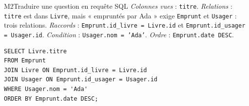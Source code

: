 \begin{fichemethode}{M2}{Traduire une question en requête SQL}
\emph{Colonnes vues} : \texttt{titre}. \emph{Relations} : \texttt{titre} est dans
\texttt{Livre}, mais « empruntés par Ada » exige \texttt{Emprunt} et \texttt{Usager} : trois
relations. \emph{Raccords} : \texttt{Emprunt.id\_livre = Livre.id} et
\texttt{Emprunt.id\_usager = Usager.id}. \emph{Condition} : \texttt{Usager.nom = 'Ada'}.
\emph{Ordre} : \texttt{Emprunt.date DESC}.

\begin{verbatim}
SELECT Livre.titre
FROM Emprunt
JOIN Livre ON Emprunt.id_livre = Livre.id
JOIN Usager ON Emprunt.id_usager = Usager.id
WHERE Usager.nom = 'Ada'
ORDER BY Emprunt.date DESC;
\end{verbatim}

%
%
%
%
%

\end{fichemethode}
